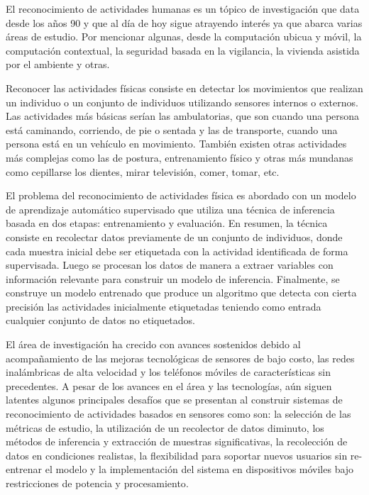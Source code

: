 \label{planteamiento}

El reconocimiento de actividades humanas es un tópico de investigación
que data desde los años 90 y que al día de hoy sigue atrayendo interés
ya que abarca varias áreas de estudio. Por mencionar algunas, desde
la computación ubicua y móvil, la computación contextual, la seguridad
basada en la vigilancia, la vivienda asistida por el ambiente y otras\cite{chen2012sensor}. 

Reconocer las actividades físicas consiste en detectar los movimientos
que realizan un individuo o un conjunto de individuos utilizando sensores
internos o externos. Las actividades más básicas serían las ambulatorias,
que son cuando una persona está caminando, corriendo, de pie o sentada
y las de transporte, cuando una persona está en un vehículo en movimiento.
También existen otras actividades más complejas como las de postura,
entrenamiento físico y otras más mundanas como cepillarse los dientes,
mirar televisión, comer, tomar, etc.\cite{LaraLabrador2013}

El problema del reconocimiento de actividades física es abordado con
un modelo de aprendizaje automático supervisado que utiliza una técnica
de inferencia basada en dos etapas: entrenamiento y evaluación\cite{LaraLabrador2013}\cite{Kwapisz2011}.
En resumen, la técnica consiste en recolectar datos previamente de
un conjunto de individuos, donde cada muestra inicial debe ser etiquetada
con la actividad identificada de forma supervisada. Luego se procesan
los datos de manera a extraer variables con información relevante
para construir un modelo de inferencia. Finalmente, se construye un
modelo entrenado que produce un algoritmo que detecta con cierta precisión
las actividades inicialmente etiquetadas teniendo como entrada cualquier
conjunto de datos no etiquetados\cite{Bao2004}.

El área de investigación ha crecido con avances sostenidos debido
al acompañamiento de las mejoras tecnológicas de sensores de bajo
costo, las redes inalámbricas de alta velocidad y los teléfonos móviles
de características sin precedentes\cite{chen2012sensor}. A pesar
de los avances en el área y las tecnologías, aún siguen latentes algunos
principales desafíos que se presentan al construir sistemas de reconocimiento
de actividades basados en sensores como son: la selección de las métricas
de estudio, la utilización de un recolector de datos diminuto, los
métodos de inferencia y extracción de muestras significativas, la
recolección de datos en condiciones realistas, la flexibilidad para
soportar nuevos usuarios sin re-entrenar el modelo y la implementación
del sistema en dispositivos móviles bajo restricciones de potencia
y procesamiento\cite{LaraLabrador2013}. 

